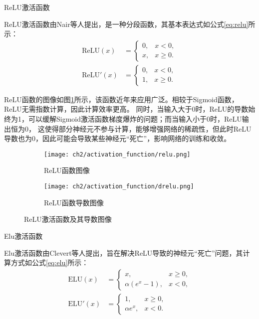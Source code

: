  ReLU激活函数

ReLU激活函数由Nair等人\cite{Nair_Hinton_2010}提出，是一种分段函数，其基本表达式如公式\eqref{eq:relu}所示：
\begin{equation}
  \begin{aligned}
  \text{ReLU}(x) &= \begin{cases}
    0, & x < 0, \\
    x, & x \geq 0.
    \end{cases} \\
  \text{ReLU}'(x) &= \begin{cases}
  0, & x < 0, \\
  1, & x \geq 0.
  \end{cases}
  \end{aligned}
  \label{eq:relu}
\end{equation}

ReLU函数的图像如图\ref{fig:relu}所示，该函数近年来应用广泛。相较于Sigmoid函数，ReLU无需指数计算，因此计算效率更高。
同时，当输入大于0时，ReLU的导数始终为1，可以缓解Sigmoid激活函数梯度爆炸的问题；而当输入小于0时，ReLU输出恒为0，
这使得部分神经元不参与计算，能够增强网络的稀疏性，但此时ReLU导数也为0，因此可能会导致某些神经元“死亡”，影响网络的训练和收敛。
\begin{figure}[H]
  \centering
  \begin{subfigure}[t]{0.45\textwidth}
    \centering
    \texttt{[image: ch2/activation\_function/relu.png]}
    \caption{ReLU函数图像}
  \end{subfigure}
  \begin{subfigure}[t]{0.45\textwidth}
    \centering
    \texttt{[image: ch2/activation\_function/drelu.png]}
    \caption{ReLU函数导数图像}
  \end{subfigure}
  \caption{ReLU激活函数及其导数图像}
  \label{fig:relu}
\end{figure}

 Elu激活函数

Elu激活函数由Clevert等人\cite{ClevertUH15}提出，旨在解决ReLU导致的神经元“死亡”问题，其计算方式如公式\eqref{eq:elu}所示：
\begin{equation}
  \begin{aligned}
  \text{ELU}(x) &= \begin{cases}
  x, & x \geq 0, \\
  \alpha \left(e^x - 1\right), & x < 0,
  \end{cases} \\
  \text{ELU}'(x) &= \begin{cases}
  1, & x \geq 0, \\
  \alpha e^x, & x < 0.
  \end{cases}
  \end{aligned}
  \label{eq:elu}
\end{equation}

